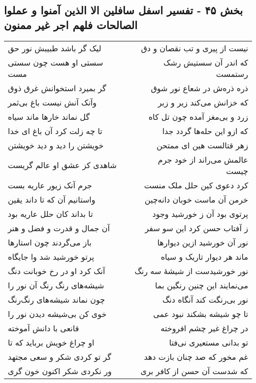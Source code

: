 \begin{center}
\section*{بخش ۴۵ - تفسیر اسفل سافلین الا الذین آمنوا و عملوا الصالحات فلهم اجر غیر ممنون}
\label{sec:sh045}
\begin{longtable}{l p{0.5cm} r}
لیک گر باشد طبیبش نور حق
&&
نیست از پیری و تب نقصان و دق
\\
سستی او هست چون سستی مست
&&
که اندر آن سستیش رشک رستمست
\\
گر بمیرد استخوانش غرق ذوق
&&
ذره ذره‌ش در شعاع نور شوق
\\
وآنک آنش نیست باغ بی‌ثمر
&&
که خزانش می‌کند زیر و زبر
\\
گل نماند خارها ماند سیاه
&&
زرد و بی‌مغز آمده چون تل کاه
\\
تا چه زلت کرد آن باغ ای خدا
&&
که ازو این حله‌ها گردد جدا
\\
خویشتن را دید و دید خویشتن
&&
زهر قتالست هین ای ممتحن
\\
شاهدی کز عشق او عالم گریست
&&
عالمش می‌راند از خود جرم چیست
\\
جرم آنک زیور عاریه بست
&&
کرد دعوی کین حلل ملک منست
\\
واستانیم آن که تا داند یقین
&&
خرمن آن ماست خوبان دانه‌چین
\\
تا بداند کان حلل عاریه بود
&&
پرتوی بود آن ز خورشید وجود
\\
آن جمال و قدرت و فضل و هنر
&&
ز آفتاب حسن کرد این سو سفر
\\
باز می‌گردند چون استارها
&&
نور آن خورشید ازین دیوارها
\\
پرتو خورشید شد وا جایگاه
&&
ماند هر دیوار تاریک و سیاه
\\
آنک کرد او در رخ خوبانت دنگ
&&
نور خورشیدست از شیشهٔ سه رنگ
\\
شیشه‌های رنگ رنگ آن نور را
&&
می‌نمایند این چنین رنگین بما
\\
چون نماند شیشه‌های رنگ‌رنگ
&&
نور بی‌رنگت کند آنگاه دنگ
\\
خوی کن بی‌شیشه دیدن نور را
&&
تا چو شیشه بشکند نبود عمی
\\
قانعی با دانش آموخته
&&
در چراغ غیر چشم افروخته
\\
او چراغ خویش برباید که تا
&&
تو بدانی مستعیری نی‌فتا
\\
گر تو کردی شکر و سعی مجتهد
&&
غم مخور که صد چنان بازت دهد
\\
ور نکردی شکر اکنون خون گری
&&
که شدست آن حسن از کافر بری
\\

\end{longtable}
\end{center}
